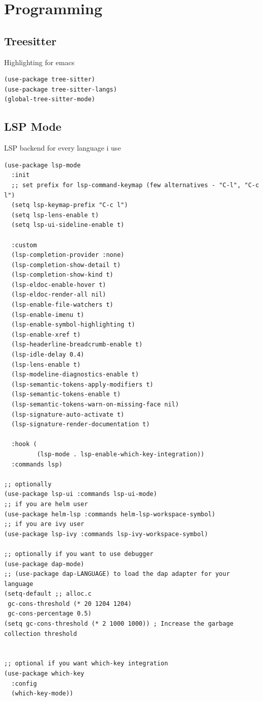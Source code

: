 \documentclass[11pt]{article}
\begin{document}
\section{Programming}
\label{sec:org482d6d2}
\subsection{Treesitter}
\label{sec:org6e9886b}
Highlighting for emacs

\begin{verbatim}
(use-package tree-sitter)
(use-package tree-sitter-langs)
(global-tree-sitter-mode)

\end{verbatim}

\subsection{LSP Mode}
\label{sec:orgb79bc9f}

LSP backend for every language i use

\begin{verbatim}
(use-package lsp-mode
  :init
  ;; set prefix for lsp-command-keymap (few alternatives - "C-l", "C-c l")
  (setq lsp-keymap-prefix "C-c l")
  (setq lsp-lens-enable t)
  (setq lsp-ui-sideline-enable t)

  :custom
  (lsp-completion-provider :none) 
  (lsp-completion-show-detail t)
  (lsp-completion-show-kind t)
  (lsp-eldoc-enable-hover t)
  (lsp-eldoc-render-all nil)
  (lsp-enable-file-watchers t)
  (lsp-enable-imenu t)
  (lsp-enable-symbol-highlighting t)
  (lsp-enable-xref t)
  (lsp-headerline-breadcrumb-enable t)
  (lsp-idle-delay 0.4)
  (lsp-lens-enable t)
  (lsp-modeline-diagnostics-enable t)
  (lsp-semantic-tokens-apply-modifiers t)
  (lsp-semantic-tokens-enable t)
  (lsp-semantic-tokens-warn-on-missing-face nil)
  (lsp-signature-auto-activate t)
  (lsp-signature-render-documentation t)

  :hook (
         (lsp-mode . lsp-enable-which-key-integration))
  :commands lsp)

;; optionally
(use-package lsp-ui :commands lsp-ui-mode)
;; if you are helm user
(use-package helm-lsp :commands helm-lsp-workspace-symbol)
;; if you are ivy user
(use-package lsp-ivy :commands lsp-ivy-workspace-symbol)

;; optionally if you want to use debugger
(use-package dap-mode)
;; (use-package dap-LANGUAGE) to load the dap adapter for your language
(setq-default ;; alloc.c
 gc-cons-threshold (* 20 1204 1204)
 gc-cons-percentage 0.5)
(setq gc-cons-threshold (* 2 1000 1000)) ; Increase the garbage collection threshold


;; optional if you want which-key integration
(use-package which-key
  :config
  (which-key-mode))
\end{verbatim}
\end{document}
